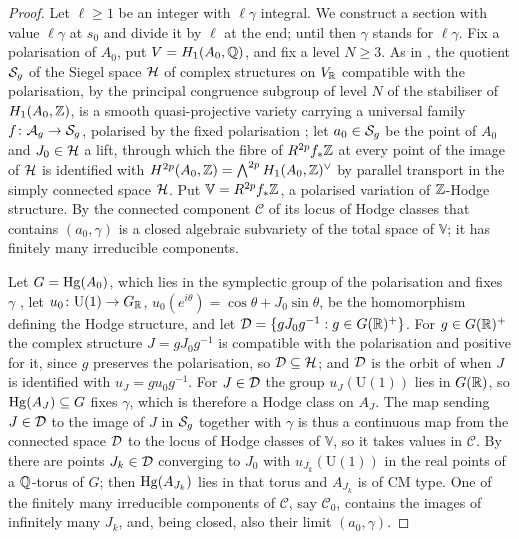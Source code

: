 \begin{proof}
Let $\ell\ge1$ be an integer with $\ell\gamma$ integral. We construct a
section with value $\ell\gamma$ at $s_{0}$ and divide it by $\ell$ at the
end; until then $\gamma$ stands for $\ell\gamma$. Fix a polarisation of
$A_{0}$, put $V=H_{1}(A_{0},\mathbb{Q})$, and fix a level $N\ge3$. As in , the
quotient $\mathcal{S}_{g}$ of the Siegel space $\mathcal{H}$ of complex structures on
$V_{\mathbb{R}}$ compatible with the polarisation, by the principal congruence
subgroup of level $N$ of the stabiliser of $H_{1}(A_{0},\mathbb{Z})$, is a smooth
quasi-projective variety carrying a universal family $f\colon\mathcal{A}_{g}\to\mathcal{S}_{g}$,
polarised by the fixed polarisation \cite{BB66}; let $a_{0}\in\mathcal{S}_{g}$ be the
point of $A_{0}$ and $J_{0}\in\mathcal{H}$ a lift, through which the fibre of
$R^{2p}f_{*}\mathbb{Z}$ at every point of the image of $\mathcal{H}$ is identified with
$H^{2p}(A_{0},\mathbb{Z})=\bigwedge^{2p}H_{1}(A_{0},\mathbb{Z})^{\vee}$ by parallel
transport in the simply connected space $\mathcal{H}$. Put
$\mathbb{V}=R^{2p}f_{*}\mathbb{Z}$, a polarised variation of $\mathbb{Z}$-Hodge
structure. By  the connected component $\mathcal{C}$ of its
locus of Hodge classes that contains $(a_{0},\gamma)$ is a closed algebraic
subvariety of the total space of $\mathbb{V}$; it has finitely many
irreducible components.

Let $G=\operatorname{Hg}(A_{0})$, which lies in the symplectic group of the polarisation
and fixes $\gamma$ \cite[\S3]{Del82}, let
$u_{0}\colon\mathrm{U}(1)\to G_{\mathbb{R}}$,
$u_{0}(e^{i\theta})=\cos\theta+J_{0}\sin\theta$, be the homomorphism defining
the Hodge structure, and let
$\mathcal{D}=\{gJ_{0}g^{-1}:g\in G(\mathbb{R})^{+}\}$. For $g\in G(\mathbb{R})^{+}$ the complex
structure $J=gJ_{0}g^{-1}$ is compatible with the polarisation and positive
for it, since $g$ preserves the polarisation, so $\mathcal{D}\subseteq\mathcal{H}$; and
$\mathcal{D}$ is the orbit of  when $J$ is identified with
$u_{J}=gu_{0}g^{-1}$. For $J\in\mathcal{D}$ the group $u_{J}(\mathrm{U}(1))$ lies in
$G(\mathbb{R})$, so $\operatorname{Hg}(A_{J})\subseteq G$ fixes $\gamma$, which is therefore a
Hodge class on $A_{J}$. The map sending $J\in\mathcal{D}$ to the image of $J$ in
$\mathcal{S}_{g}$ together with $\gamma$ is thus a continuous map from the
connected space $\mathcal{D}$ to the locus of Hodge classes of $\mathbb{V}$, so it
takes values in $\mathcal{C}$. By  there are points
$J_{k}\in\mathcal{D}$ converging to $J_{0}$ with $u_{J_{k}}(\mathrm{U}(1))$ in the
real points of a $\mathbb{Q}$-torus of $G$; then $\operatorname{Hg}(A_{J_{k}})$ lies in that torus
and $A_{J_{k}}$ is of CM type. One of the finitely many irreducible
components of $\mathcal{C}$, say $\mathcal{C}_{0}$, contains the images of
infinitely many $J_{k}$, and, being closed, also their limit $(a_{0},\gamma)$.


\end{proof}
